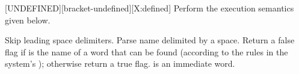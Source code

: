 \begin{worddef}{}{[UNDEFINED]}[bracket-undefined][X:defined]
\compile
	Perform the execution semantics given below.

\execute

	Skip leading space delimiters.  Parse name delimited by a space.
	Return a false flag if  is the name of a word that
	can be found (according to the rules in the system's );
	otherwise return a true flag. \word{[UNDEFINED]} is an immediate
	word.

	\begin{implement} %
		\word{:} \word{[UNDEFINED]}      \word{;} 
	\end{implement}
\end{worddef}
